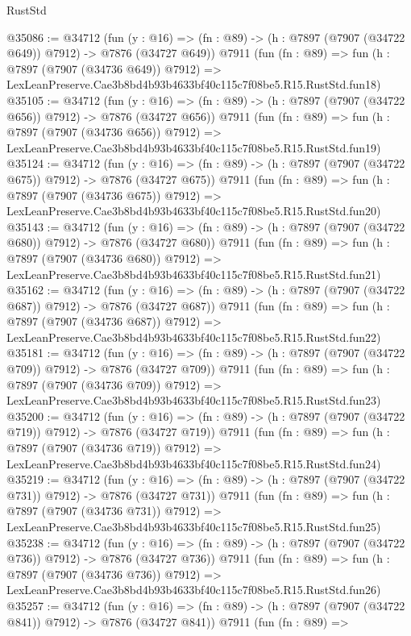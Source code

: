 \begin{lexlean}{RustStd}
\begin{coremodule}
@35086 := @34712
    (fun (y : @16) => (fn : @89) -> (h : @7897 (@7907 (@34722 @649)) @7912) -> @7876 (@34727 @649))
    @7911
    (fun (fn : @89) =>
    fun (h : @7897 (@7907 (@34736 @649)) @7912) =>
    LexLeanPreserve.Cae3b8bd4b93b4633bf40c115c7f08be5.R15.RustStd.fun18)
@35105 := @34712
    (fun (y : @16) => (fn : @89) -> (h : @7897 (@7907 (@34722 @656)) @7912) -> @7876 (@34727 @656))
    @7911
    (fun (fn : @89) =>
    fun (h : @7897 (@7907 (@34736 @656)) @7912) =>
    LexLeanPreserve.Cae3b8bd4b93b4633bf40c115c7f08be5.R15.RustStd.fun19)
@35124 := @34712
    (fun (y : @16) => (fn : @89) -> (h : @7897 (@7907 (@34722 @675)) @7912) -> @7876 (@34727 @675))
    @7911
    (fun (fn : @89) =>
    fun (h : @7897 (@7907 (@34736 @675)) @7912) =>
    LexLeanPreserve.Cae3b8bd4b93b4633bf40c115c7f08be5.R15.RustStd.fun20)
@35143 := @34712
    (fun (y : @16) => (fn : @89) -> (h : @7897 (@7907 (@34722 @680)) @7912) -> @7876 (@34727 @680))
    @7911
    (fun (fn : @89) =>
    fun (h : @7897 (@7907 (@34736 @680)) @7912) =>
    LexLeanPreserve.Cae3b8bd4b93b4633bf40c115c7f08be5.R15.RustStd.fun21)
@35162 := @34712
    (fun (y : @16) => (fn : @89) -> (h : @7897 (@7907 (@34722 @687)) @7912) -> @7876 (@34727 @687))
    @7911
    (fun (fn : @89) =>
    fun (h : @7897 (@7907 (@34736 @687)) @7912) =>
    LexLeanPreserve.Cae3b8bd4b93b4633bf40c115c7f08be5.R15.RustStd.fun22)
@35181 := @34712
    (fun (y : @16) => (fn : @89) -> (h : @7897 (@7907 (@34722 @709)) @7912) -> @7876 (@34727 @709))
    @7911
    (fun (fn : @89) =>
    fun (h : @7897 (@7907 (@34736 @709)) @7912) =>
    LexLeanPreserve.Cae3b8bd4b93b4633bf40c115c7f08be5.R15.RustStd.fun23)
@35200 := @34712
    (fun (y : @16) => (fn : @89) -> (h : @7897 (@7907 (@34722 @719)) @7912) -> @7876 (@34727 @719))
    @7911
    (fun (fn : @89) =>
    fun (h : @7897 (@7907 (@34736 @719)) @7912) =>
    LexLeanPreserve.Cae3b8bd4b93b4633bf40c115c7f08be5.R15.RustStd.fun24)
@35219 := @34712
    (fun (y : @16) => (fn : @89) -> (h : @7897 (@7907 (@34722 @731)) @7912) -> @7876 (@34727 @731))
    @7911
    (fun (fn : @89) =>
    fun (h : @7897 (@7907 (@34736 @731)) @7912) =>
    LexLeanPreserve.Cae3b8bd4b93b4633bf40c115c7f08be5.R15.RustStd.fun25)
@35238 := @34712
    (fun (y : @16) => (fn : @89) -> (h : @7897 (@7907 (@34722 @736)) @7912) -> @7876 (@34727 @736))
    @7911
    (fun (fn : @89) =>
    fun (h : @7897 (@7907 (@34736 @736)) @7912) =>
    LexLeanPreserve.Cae3b8bd4b93b4633bf40c115c7f08be5.R15.RustStd.fun26)
@35257 := @34712
    (fun (y : @16) => (fn : @89) -> (h : @7897 (@7907 (@34722 @841)) @7912) -> @7876 (@34727 @841))
    @7911
    (fun (fn : @89) =>

\end{coremodule}
\end{lexlean}
